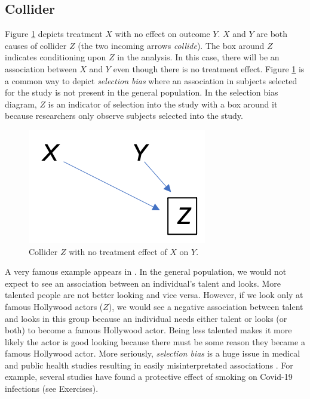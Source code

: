 \documentclass[
]{book}
\begin{document}
\hypertarget{collider}{%
\subsection{Collider}\label{collider}}

Figure \ref{fig:collider} depicts treatment \(X\) with no effect on outcome \(Y\). \(X\) and \(Y\) are both causes of collider \(Z\) (the two incoming arrows \emph{collide}). The box around \(Z\) indicates conditioning upon \(Z\) in the analysis. In this case, there will be an association between \(X\) and \(Y\) even though there is no treatment effect. Figure \ref{fig:collider} is a common way to depict \emph{selection bias} where an association in subjects selected for the study is not present in the general population. In the selection bias diagram, \(Z\) is an indicator of selection into the study with a box around it because researchers only observe subjects selected into the study.

\begin{figure}
\centering
\includegraphics{./images/collider.png}
\caption{\label{fig:collider} Collider \(Z\) with no treatment effect of \(X\) on \(Y\).}
\end{figure}

A very famous example appears in \citet{pearl2018book}. In the general population, we would not expect to see an association between an individual's talent and looks. More talented people are not better looking and vice versa. However, if we look only at famous Hollywood actors (\(Z\)), we would see a negative association between talent and looks in this group because an individual needs either talent or looks (or both) to become a famous Hollywood actor. Being less talented makes it more likely the actor is good looking because there must be some reason they became a famous Hollywood actor. More seriously, \emph{selection bias} is a huge issue in medical and public health studies resulting in easily misinterpretated associations \citep{hernan2004structural, cole2010illustrating, elwert2014endogenous}. For example, several studies have found a protective effect of smoking on Covid-19 infections (see Exercises).
\end{document}
